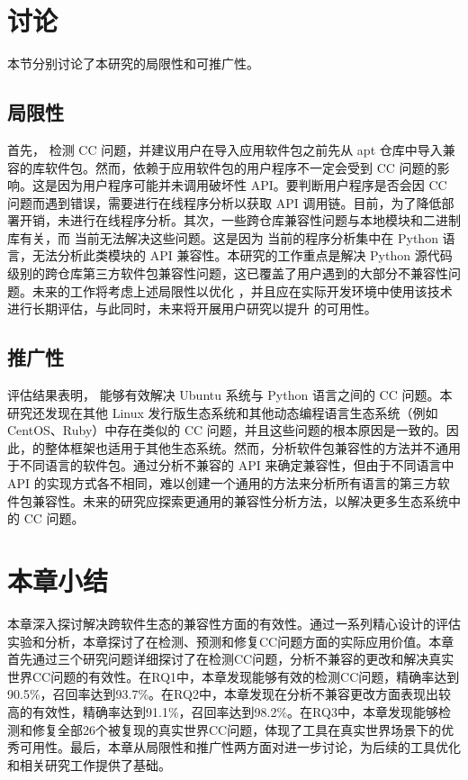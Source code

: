 \section{讨论}
本节分别讨论了本研究的局限性和可推广性。
\subsection{局限性}
首先，\tool{} 检测 CC 问题，并建议用户在导入应用软件包之前先从 apt 仓库中导入兼容的库软件包。然而，依赖于应用软件包的用户程序不一定会受到 CC 问题的影响。这是因为用户程序可能并未调用破坏性 API。要判断用户程序是否会因 CC 问题而遇到错误，需要进行在线程序分析以获取 API 调用链。目前，为了降低部署开销，\tool{}未进行在线程序分析。其次，一些跨仓库兼容性问题与本地模块和二进制库有关，而 \tool{} 当前无法解决这些问题。这是因为 \tool{} 当前的程序分析集中在 Python 语言，无法分析此类模块的 API 兼容性。本研究的工作重点是解决 Python 源代码级别的跨仓库第三方软件包兼容性问题，这已覆盖了用户遇到的大部分不兼容性问题。未来的工作将考虑上述局限性以优化 \tool{}，并且应在实际开发环境中使用该技术进行长期评估，与此同时，未来将开展用户研究以提升 \tool{} 的可用性。
\subsection{推广性}
评估结果表明，\tool{} 能够有效解决 Ubuntu 系统与 Python 语言之间的 CC 问题。本研究还发现在其他 Linux 发行版生态系统和其他动态编程语言生态系统（例如 CentOS、Ruby）中存在类似的 CC 问题，并且这些问题的根本原因是一致的。因此，\tool{}的整体框架也适用于其他生态系统。然而，分析软件包兼容性的方法并不通用于不同语言的软件包。\tool{}通过分析不兼容的 API 来确定兼容性，但由于不同语言中 API 的实现方式各不相同，难以创建一个通用的方法来分析所有语言的第三方软件包兼容性。未来的研究应探索更通用的兼容性分析方法，以解决更多生态系统中的 CC 问题。

\section{本章小结}
本章深入探讨\tool{}解决跨软件生态的兼容性方面的有效性。通过一系列精心设计的评估实验和分析，本章探讨了\tool{}在检测、预测和修复CC问题方面的实际应用价值。本章首先通过三个研究问题详细探讨了\tool{}在检测CC问题，分析不兼容的更改和解决真实世界CC问题的有效性。在RQ1中，本章发现\tool{}能够有效的检测CC问题，精确率达到90.5\%，召回率达到93.7\%。在RQ2中，本章发现\tool{}在分析不兼容更改方面表现出较高的有效性，精确率达到91.1\%，召回率达到98.2\%。在RQ3中，本章发现\tool{}能够检测和修复全部26个被复现的真实世界CC问题，体现了工具在真实世界场景下的优秀可用性。最后，本章从局限性和推广性两方面对\tool{}进一步讨论，为后续的工具优化和相关研究工作提供了基础。